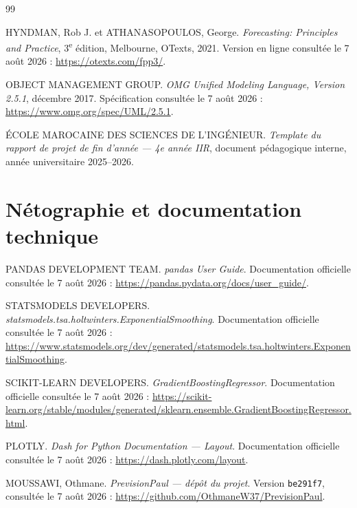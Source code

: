 \clearpage
\renewcommand{\bibname}{Bibliographie et nétographie}
{}
\begin{thebibliography}{99}


HYNDMAN, Rob J. et ATHANASOPOULOS, George.
\textit{Forecasting: Principles and Practice}, 3\textsuperscript{e} édition,
Melbourne, OTexts, 2021. Version en ligne consultée le 7 août 2026 :
\url{https://otexts.com/fpp3/}.

OBJECT MANAGEMENT GROUP.
\textit{OMG Unified Modeling Language, Version 2.5.1}, décembre 2017.
Spécification consultée le 7 août 2026 :
\url{https://www.omg.org/spec/UML/2.5.1}.

ÉCOLE MAROCAINE DES SCIENCES DE L'INGÉNIEUR.
\textit{Template du rapport de projet de fin d'année — 4e année IIR},
document pédagogique interne, année universitaire 2025--2026.

\section*{Nétographie et documentation technique}

PANDAS DEVELOPMENT TEAM.
\textit{pandas User Guide}. Documentation officielle consultée le 7 août 2026 :
\url{https://pandas.pydata.org/docs/user_guide/}.

STATSMODELS DEVELOPERS.
\textit{statsmodels.tsa.holtwinters.ExponentialSmoothing}.
Documentation officielle consultée le 7 août 2026 :
\url{https://www.statsmodels.org/dev/generated/statsmodels.tsa.holtwinters.ExponentialSmoothing}.

SCIKIT-LEARN DEVELOPERS.
\textit{GradientBoostingRegressor}. Documentation officielle consultée le
7 août 2026 :
\url{https://scikit-learn.org/stable/modules/generated/sklearn.ensemble.GradientBoostingRegressor.html}.

PLOTLY.
\textit{Dash for Python Documentation — Layout}.
Documentation officielle consultée le 7 août 2026 :
\url{https://dash.plotly.com/layout}.

MOUSSAWI, Othmane.
\textit{PrevisionPaul — dépôt du projet}.
Version \texttt{be291f7}, consultée le 7 août 2026 :
\url{https://github.com/OthmaneW37/PrevisionPaul}.

\end{thebibliography}

